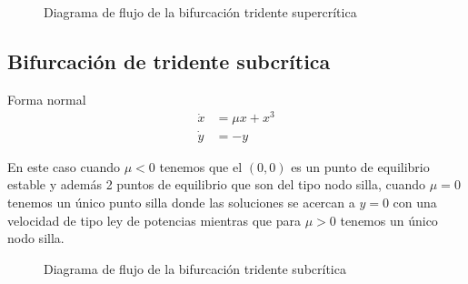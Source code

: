 \begin{figure}[H]
 \centering
		\caption{Diagrama de flujo de la bifurcación tridente supercrítica}
 \label{biftsup}
\end{figure}

\subsection*{Bifurcación de tridente subcrítica}

Forma normal
\begin{align*}
	\dot{x} &= \mu x + x^3 \\
	\dot{y} &=  -y
\end{align*}

En este caso cuando $\mu<0$ tenemos que el $(0,0)$ es un punto de equilibrio estable y además 2 puntos de equilibrio que son del tipo nodo silla, cuando $ \mu=0$ tenemos un único punto silla donde las soluciones se acercan a $y=0$ con una velocidad de tipo ley de potencias mientras que para $ \mu>0$ tenemos un único nodo silla. 

\begin{figure}[H]
 \centering
		\caption{Diagrama de flujo de la bifurcación tridente subcrítica}
\end{figure}

